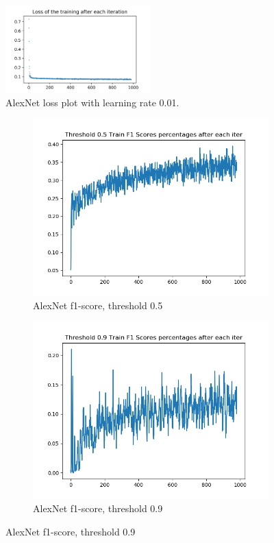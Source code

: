 \begin{figure}[!ht]
\centering
\includegraphics[width=0.5\textwidth]{alexnet-lazy-1_0-train-loss.png}
\caption{\label{alexnet:alexnet-lazy-1_0-loss}AlexNet loss plot with learning rate 0.01.}
\end{figure}

\begin{figure}[!ht]
\centering
\begin{subfigure}{.5\textwidth}
	\centering
	\includegraphics[width=1\linewidth]{alexnet-lazy-1_0-train-scores-f1-5.png}
	\caption{\label{alexnet:alexnet-lazy-1_0-train-scores-f1-5}AlexNet f1-score, threshold 0.5}
\end{subfigure}%
\begin{subfigure}{.5\textwidth}
	\centering
	\includegraphics[width=1\linewidth]{alexnet-lazy-1_0-train-scores-f1-9.png}
	\caption{ \label{alexnet:alexnet-lazy-1_0-train-scores-f1-9}AlexNet f1-score, threshold 0.9}
\end{subfigure}
\end{figure}
